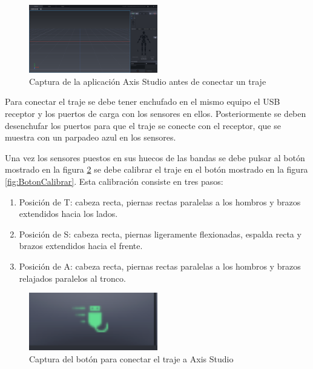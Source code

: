 \begin{figure}[H]
	\centering
	\includegraphics[width=0.5\textwidth]{Imagenes/Bitmap/AxisSinTraje.PNG}
	\caption{Captura de la aplicación Axis Studio antes de conectar un traje}
	\label{fig:AxisSinTraje}
\end{figure}

Para conectar el traje se debe tener enchufado en el mismo equipo el USB receptor y los puertos de carga con los sensores en ellos.
Posteriormente se deben desenchufar los puertos para que el traje se conecte con el receptor, que se muestra con un parpadeo azul en los sensores.

Una vez los sensores puestos en sus huecos de las bandas se debe pulsar al botón mostrado en la figura \ref{fig:BotonConectar} se debe calibrar el traje en el botón mostrado en la figura \ref{fig:BotonCalibrar}.
Esta calibración consiste en tres pasos:
\begin{enumerate}
	\item Posición de T: cabeza recta, piernas rectas paralelas a los hombros y brazos extendidos hacia los lados.
	\item Posición de S: cabeza recta, piernas ligeramente flexionadas, espalda recta y brazos extendidos hacia el frente.
	\item Posición de A: cabeza recta, piernas rectas paralelas a los hombros y brazos relajados paralelos al tronco.
\end{enumerate}

\begin{figure}[H]
	\centering
	\includegraphics[width=0.5\textwidth]{Imagenes/Bitmap/ConectarTraje.PNG}
	\caption{Captura del botón para conectar el traje a Axis Studio}
	\label{fig:BotonConectar}
\end{figure}

